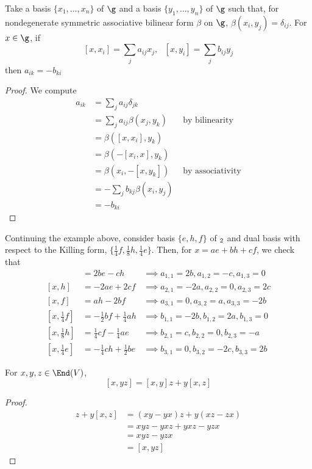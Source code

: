 \documentclass[11pt,leqno,oneside]{amsart}
\numberwithin{thm}{section}
\begin{document}
\begin{lem}
  Take a basis \(\{x_1,\ldots,x_n\}\) of \(\g\) and a basis \(\{y_1,
  \ldots, y_n\}\) of \(\g\) such that, for nondegenerate symmetric
  associative bilinear form \(\beta\) on \(\g\), \(\beta(x_i,y_j)
  = \delta_{ij}\). For \(x \in \g\), if \[ 
    [x,x_i] = \sum_j a_{ij} x_j, \ \ \ [x,y_i] = \sum_j b_{ij} y_j
  \]
  then \(a_{ik} = -b_{ki}\)
\end{lem}
\begin{proof}
  We compute
  \begin{align*}
    a_{ik}
    & = \sum_j a_{ij} \delta_{jk} \\
    & = \sum_j a_{ij} \beta(x_j, y_k) & \text{ by bilinearity}\\
    & = \beta([x,x_i],y_k) \\
    & = \beta(-[x_i,x],y_k)  \\
    & = \beta(x_i, -[x,y_k])  & \text{ by associativity} \\
    & = - \sum_j b_{kj} \beta(x_i, y_j) \\
    & = -b_{ki}
  \end{align*}
\end{proof}
\begin{example}
  Continuing the example above, consider basis \(\{e,h,f\}\) of
  \(\sl_2\) and dual basis with respect to the Killing form,
  \(\{\frac{1}{4}f, \frac{1}{8}h, 
  \frac{1}{4}e\}\). Then, for \(x = ae+bh+cf\), we check that
  \begin{align*}
    [x,e] & = 2be-ch
    & \implies a_{1,1} = 2b, a_{1,2}=-c, a_{1,3} = 0\\
    [x,h] & = -2ae+2cf
    & \implies a_{2,1} = -2a, a_{2,2} = 0, a_{2,3} = 2c\\
    [x,f] & = ah-2bf
    & \implies a_{3,1} = 0, a_{3,2} = a, a_{3,3} = -2b\\
    [x,\frac{1}{4}f]
          & = -\frac{1}{2}bf+\frac{1}{4}ah
    & \implies b_{1,1} = -2b, b_{1,2}=2a, b_{1,3} = 0\\
    [x,\frac{1}{8}h] & = \frac{1}{4}cf-\frac{1}{4}ae
    &\implies b_{2,1} = c, b_{2,2} = 0, b_{2,3} = -a\\
    [x,\frac{1}{4}e] & = -\frac{1}{4}ch + \frac{1}{2}be
    &\implies b_{3,1} = 0, b_{3,2} = -2c, b_{3,3} = 2b
  \end{align*}
\end{example}
\begin{lem}
  For \(x,y,z \in \End(V)\), \[
    [x,yz] = [x,y]z + y[x,z]
  \]
\end{lem}
\begin{proof}
  \begin{align*}
    [x,y]z + y[x,z]
    & = (xy-yx)z + y(xz-zx) \\
    & = xyz - yxz + yxz - yzx \\
    & = xyz - yzx \\
    & = [x,yz]
  \end{align*}
\end{proof}
\end{document}
